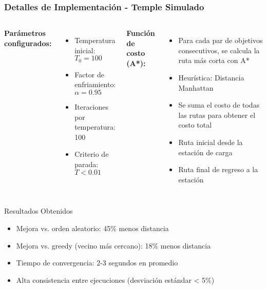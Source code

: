 \documentclass[aspectratio=169]{beamer}
\begin{document}
\begin{frame}
    \frametitle{Detalles de Implementación - Temple Simulado}
    \begin{columns}
        \textbf{Parámetros configurados:}
        \begin{itemize}
            \item Temperatura inicial: $T_0 = 100$
            \item Factor de enfriamiento: $\alpha = 0.95$
            \item Iteraciones por temperatura: 100
            \item Criterio de parada: $T < 0.01$
        \end{itemize}
        
        \textbf{Función de costo (A*):}
        \begin{itemize}
            \item Para cada par de objetivos consecutivos, se calcula la ruta más corta con A*
            \item Heurística: Distancia Manhattan
            \item Se suma el costo de todas las rutas para obtener el costo total
            \item Ruta inicial desde la estación de carga
            \item Ruta final de regreso a la estación
        \end{itemize}
    \end{columns}
    
    \vspace{0.3cm}
    \begin{block}{Resultados Obtenidos}
        \begin{itemize}
            \item Mejora vs. orden aleatorio: 45\% menos distancia
            \item Mejora vs. greedy (vecino más cercano): 18\% menos distancia
            \item Tiempo de convergencia: 2-3 segundos en promedio
            \item Alta consistencia entre ejecuciones (desviación estándar < 5\%)
        \end{itemize}
    \end{block}
\end{frame}
\end{document}
